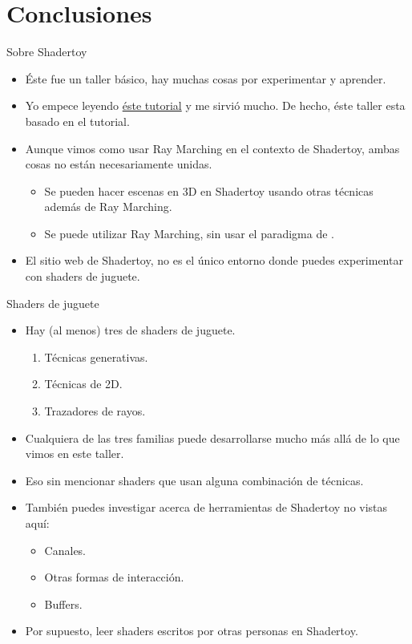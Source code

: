 \section{Conclusiones}

\begin{frame}{Sobre Shadertoy}
\begin{itemize}
    \item Éste fue un taller básico, hay muchas cosas por experimentar y aprender.
    \item Yo empece leyendo \href{https://inspirnathan.com/posts/47-shadertoy-tutorial-part-1}{éste tutorial} y me sirvió mucho. De hecho, éste taller esta basado en el tutorial.
    \item Aunque vimos como usar Ray Marching en el contexto de Shadertoy, ambas cosas no están necesariamente unidas.
    \begin{itemize}
        \item Se pueden hacer escenas en 3D en Shadertoy usando otras técnicas además de Ray Marching.
        \item Se puede utilizar Ray Marching, sin usar el paradigma de .
    \end{itemize}
    \item El sitio web de Shadertoy, no es el único entorno donde puedes experimentar con shaders de juguete.
\end{itemize}
\end{frame}

\begin{frame}{Shaders de juguete}
\begin{itemize}
     \item Hay (al menos) tres  de shaders de juguete.
     \begin{enumerate}
        \item Técnicas generativas.
        \item Técnicas de 2D.
        \item Trazadores de rayos.         
     \end{enumerate}
     \item Cualquiera de las tres familias puede desarrollarse mucho más allá de lo que vimos en este taller.
     \item Eso sin mencionar shaders que usan alguna combinación de técnicas.
     \item También puedes investigar acerca de herramientas de Shadertoy no vistas aquí:
     \begin{itemize}
        \item Canales.
        \item Otras formas de interacción.
        \item Buffers.
     \end{itemize}
     \item Por supuesto, leer shaders escritos por otras personas en Shadertoy.
 \end{itemize}
\end{frame}


